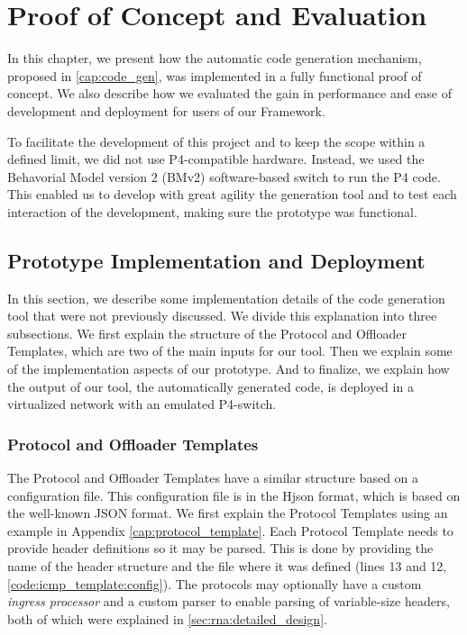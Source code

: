 \chapter{Proof of Concept and Evaluation}
\label{cap:evaluation}

In this chapter, we present how the automatic code generation mechanism, proposed in \autoref{cap:code_gen}, was implemented in a fully functional proof of concept. We also describe how we evaluated the gain in performance and ease of development and deployment for users of our Framework.

To facilitate the development of this project and to keep the scope within a defined limit, we did not use P4-compatible hardware. Instead, we used the Behavorial Model version 2 (BMv2) software-based switch \cite{BMv2} to run the P4 code. This enabled us to develop with great agility the generation tool and to test each interaction of the development, making sure the prototype was functional.


\section{Prototype Implementation and Deployment}
\label{sec:evaluation:implementation}

In this section, we describe some implementation details of the code generation tool that were not previously discussed. We divide this explanation into three subsections. We first explain the structure of the Protocol and Offloader Templates, which are two of the main inputs for our tool. Then we explain some of the implementation aspects of our prototype. And to finalize, we explain how the output of our tool, the automatically generated code, is deployed in a virtualized network with an emulated P4-switch.


\subsection{Protocol and Offloader Templates}

The Protocol and Offloader Templates have a similar structure based on a configuration file. This configuration file is in the Hjson \cite{Hjson} format, which is based on the well-known JSON format. We first explain the Protocol Templates using an example in Appendix \ref{cap:protocol_template}. Each Protocol Template needs to provide header definitions so it may be parsed. This is done by providing the name of the header structure and the file where it was defined (lines 13 and 12, \autoref{code:icmp_template:config}). The protocols may optionally have a custom \textit{ingress processor} and a custom parser to enable parsing of variable-size headers, both of which were explained in \autoref{sec:rna:detailed_design}.

